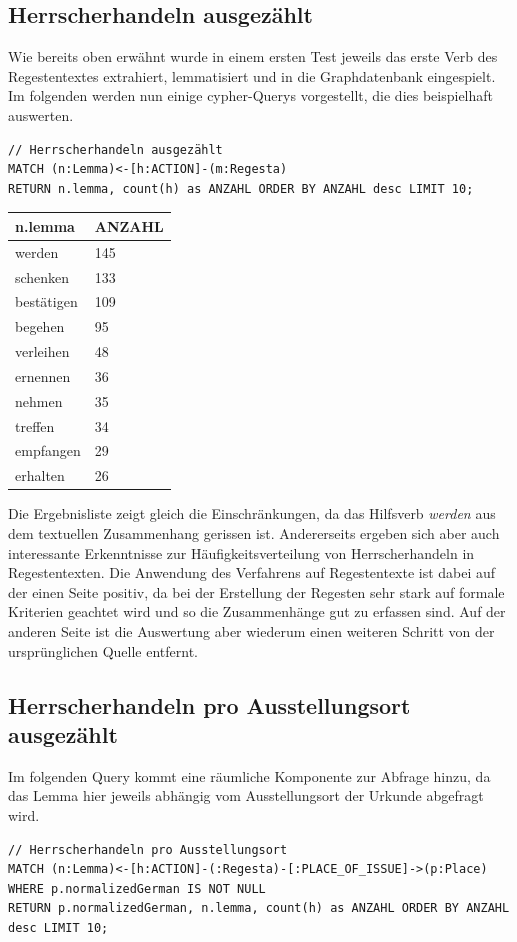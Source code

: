 \documentclass[ngerman,]{scrreprt}
\begin{document}
\subsection{Herrscherhandeln ausgezählt}\label{herrscherhandeln-ausgezuxe4hlt}

Wie bereits oben erwähnt wurde in einem ersten Test jeweils das erste Verb des Regestentextes extrahiert, lemmatisiert und in die Graphdatenbank eingespielt. Im folgenden werden nun einige cypher-Querys vorgestellt, die dies beispielhaft auswerten.

\begin{verbatim}
// Herrscherhandeln ausgezählt
MATCH (n:Lemma)<-[h:ACTION]-(m:Regesta)
RETURN n.lemma, count(h) as ANZAHL ORDER BY ANZAHL desc LIMIT 10;
\end{verbatim}

\begin{longtable}[]{@{}ll@{}}
\toprule
n.lemma & ANZAHL\tabularnewline
\midrule
\endhead
werden & 145\tabularnewline
schenken & 133\tabularnewline
bestätigen & 109\tabularnewline
begehen & 95\tabularnewline
verleihen & 48\tabularnewline
ernennen & 36\tabularnewline
nehmen & 35\tabularnewline
treffen & 34\tabularnewline
empfangen & 29\tabularnewline
erhalten & 26\tabularnewline
\bottomrule
\end{longtable}

Die Ergebnisliste zeigt gleich die Einschränkungen, da das Hilfsverb \emph{werden} aus dem textuellen Zusammenhang gerissen ist. Andererseits ergeben sich aber auch interessante Erkenntnisse zur Häufigkeitsverteilung von Herrscherhandeln in Regestentexten. Die Anwendung des Verfahrens auf Regestentexte ist dabei auf der einen Seite positiv, da bei der Erstellung der Regesten sehr stark auf formale Kriterien geachtet wird und so die Zusammenhänge gut zu erfassen sind. Auf der anderen Seite ist die Auswertung aber wiederum einen weiteren Schritt von der ursprünglichen Quelle entfernt.

\subsection{Herrscherhandeln pro Ausstellungsort ausgezählt}\label{herrscherhandeln-pro-ausstellungsort-ausgezuxe4hlt}

Im folgenden Query kommt eine räumliche Komponente zur Abfrage hinzu, da das Lemma hier jeweils abhängig vom Ausstellungsort der Urkunde abgefragt wird.

\begin{verbatim}
// Herrscherhandeln pro Ausstellungsort
MATCH (n:Lemma)<-[h:ACTION]-(:Regesta)-[:PLACE_OF_ISSUE]->(p:Place)
WHERE p.normalizedGerman IS NOT NULL
RETURN p.normalizedGerman, n.lemma, count(h) as ANZAHL ORDER BY ANZAHL desc LIMIT 10;
\end{verbatim}
\end{document}
